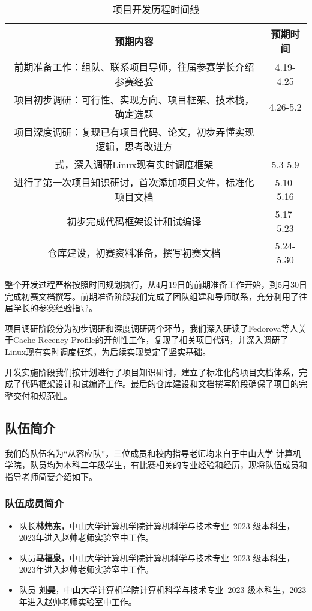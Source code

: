 \begin{table}[h]
\centering
\begin{tabular}{cc}
\toprule
预期内容 & 预期时间 \\
\midrule
前期准备工作：组队、联系项目导师，往届参赛学长介绍参赛经验 & 4.19-4.25 \\
\midrule
项目初步调研：可行性、实现方向、项目框架、技术栈，确定选题 & 4.26-5.2 \\
\midrule
项目深度调研：复现已有项目代码、论文，初步弄懂实现逻辑，思考改进方 & \\
式，深入调研Linux现有实时调度框架 & 5.3-5.9 \\
\midrule
进行了第一次项目知识研讨，首次添加项目文件，标准化项目文档 & 5.10-5.16 \\
\midrule
初步完成代码框架设计和试编译 & 5.17-5.23 \\
\midrule
仓库建设，初赛资料准备，撰写初赛文档 & 5.24-5.30 \\
\bottomrule
\end{tabular}
\caption{项目开发历程时间线}
\label{tab:development-timeline}
\end{table}

整个开发过程严格按照时间规划执行，从4月19日的前期准备工作开始，到5月30日完成初赛文档撰写。前期准备阶段我们完成了团队组建和导师联系，充分利用了往届学长的参赛经验指导。

项目调研阶段分为初步调研和深度调研两个环节，我们深入研读了Fedorova等人关于Cache Recency Profile的开创性工作，复现了相关项目代码，并深入调研了Linux现有实时调度框架，为后续实现奠定了坚实基础。

开发实施阶段我们按计划进行了项目知识研讨，建立了标准化的项目文档体系，完成了代码框架设计和试编译工作。最后的仓库建设和文档撰写阶段确保了项目的完整交付和规范性。

\subsection{队伍简介} \label{sec:team-intro}
我们的队伍名为“从容应队”，三位成员和校内指导老师均来自于中山大学
计算机学院，队员均为本科二年级学生，有比赛相关的专业经验和经历，现将队伍成员和指导老师简要介绍如下。
\subsubsection{队伍成员简介}
\begin{itemize}
\item 队长\textbf{林炜东}，中山大学计算机学院计算机科学与技术专业 2023
级本科生，2023年进入赵帅老师实验室中工作。
\item 队员\textbf{马福泉}，中山大学计算机学院计算机科学与技术专业 2023
级本科生，2023年进入赵帅老师实验室中工作。
\item 队员 \textbf{刘昊}，中山大学计算机学院计算机科学与技术专业 2023
级本科生，2023年进入赵帅老师实验室中工作。
\end{itemize}

